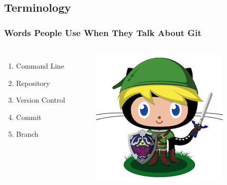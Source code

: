 \documentclass{beamer}
\begin{document}
\subsection{Terminology}
\begin{frame}
\frametitle{Words People Use When They Talk About Git}
\begin{columns}[c] %

\begin{enumerate}
\item Command Line
\item Repository
\item Version Control
\item Commit
\item Branch
\end{enumerate}

\begin{figure}
\includegraphics[width=1.1\linewidth]{terms}
\end{figure}
\end{columns}
\end{frame}
\end{document}
